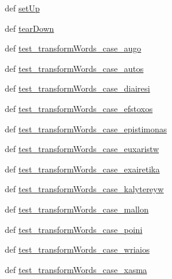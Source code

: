 \begin{DoxyCompactItemize}
\item 
def \hyperlink{classgreek__support__unit__tests_1_1TestAudioProcessing_a235dfd8fbbba93a77b341ebf8d7fb44f}{set\-Up}
\item 
def \hyperlink{classgreek__support__unit__tests_1_1TestAudioProcessing_a412e0172ba6255e53dd93b8499e0ae6f}{tear\-Down}
\item 
def \hyperlink{classgreek__support__unit__tests_1_1TestAudioProcessing_accc68064811fbf07a0602bfe4cbef643}{test\-\_\-transform\-Words\-\_\-case\-\_\-augo}
\item 
def \hyperlink{classgreek__support__unit__tests_1_1TestAudioProcessing_a3fcb700842d6d592f3b8b17fbff14eb7}{test\-\_\-transform\-Words\-\_\-case\-\_\-autos}
\item 
def \hyperlink{classgreek__support__unit__tests_1_1TestAudioProcessing_ab2c5d249fc9c76099d912aa38473da6d}{test\-\_\-transform\-Words\-\_\-case\-\_\-diairesi}
\item 
def \hyperlink{classgreek__support__unit__tests_1_1TestAudioProcessing_a33b4e7e80a4d51dd1a110a9168f0134c}{test\-\_\-transform\-Words\-\_\-case\-\_\-efstoxos}
\item 
def \hyperlink{classgreek__support__unit__tests_1_1TestAudioProcessing_a73f0bbc7b7398f3bfde28db3a8b1085f}{test\-\_\-transform\-Words\-\_\-case\-\_\-epistimonas}
\item 
def \hyperlink{classgreek__support__unit__tests_1_1TestAudioProcessing_a5e9e5337ec1de418f16ba04acb7d1195}{test\-\_\-transform\-Words\-\_\-case\-\_\-euxaristw}
\item 
def \hyperlink{classgreek__support__unit__tests_1_1TestAudioProcessing_a3b50e7709fbb7b7da7ab8480cca54f90}{test\-\_\-transform\-Words\-\_\-case\-\_\-exairetika}
\item 
def \hyperlink{classgreek__support__unit__tests_1_1TestAudioProcessing_a56bb0a110961ac313238583ac0a9456b}{test\-\_\-transform\-Words\-\_\-case\-\_\-kalytereyw}
\item 
def \hyperlink{classgreek__support__unit__tests_1_1TestAudioProcessing_a0edd822483fc91718e6dec07c86f6df8}{test\-\_\-transform\-Words\-\_\-case\-\_\-mallon}
\item 
def \hyperlink{classgreek__support__unit__tests_1_1TestAudioProcessing_a32eee319e08aab6a4414c688536494c7}{test\-\_\-transform\-Words\-\_\-case\-\_\-poini}
\item 
def \hyperlink{classgreek__support__unit__tests_1_1TestAudioProcessing_a781e2f5b661dc058cdc9c6ad129d0332}{test\-\_\-transform\-Words\-\_\-case\-\_\-wriaios}
\item 
def \hyperlink{classgreek__support__unit__tests_1_1TestAudioProcessing_a994d5c8dcfd668c5577a396454af1529}{test\-\_\-transform\-Words\-\_\-case\-\_\-xasma}
\end{DoxyCompactItemize}
